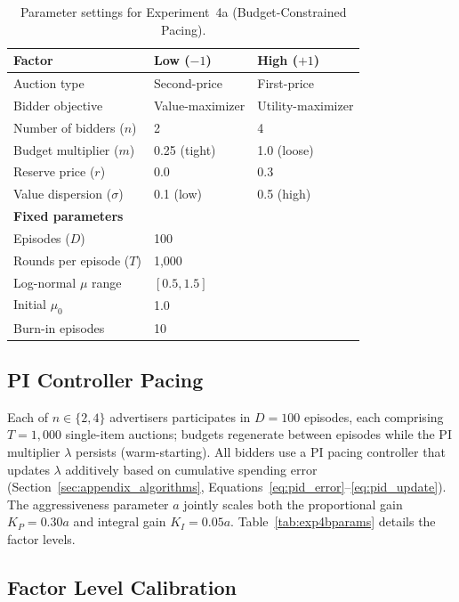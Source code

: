 \begin{table}[H]
\centering
\caption{Parameter settings for Experiment~4a (Budget-Constrained Pacing).}
\label{tab:exp4aparams}
\begin{tabular}{l l l}
\toprule
\textbf{Factor} & \textbf{Low ($-1$)} & \textbf{High ($+1$)}\\
\midrule
Auction type & Second-price & First-price \\
Bidder objective & Value-maximizer & Utility-maximizer \\
Number of bidders ($n$) & 2 & 4 \\
Budget multiplier ($m$) & 0.25 (tight) & 1.0 (loose) \\
Reserve price ($r$) & 0.0 & 0.3 \\
Value dispersion ($\sigma$) & 0.1 (low) & 0.5 (high) \\
\midrule
\multicolumn{3}{l}{\textbf{Fixed parameters}} \\
\midrule
Episodes ($D$) & \multicolumn{2}{l}{100} \\
Rounds per episode ($T$) & \multicolumn{2}{l}{1{,}000} \\
Log-normal $\mu$ range & \multicolumn{2}{l}{$[0.5, 1.5]$} \\
Initial $\mu_0$ & \multicolumn{2}{l}{1.0} \\
Burn-in episodes & \multicolumn{2}{l}{10} \\
\bottomrule
\end{tabular}
\end{table}

\subsection{PI Controller Pacing}

Each of $n \in \{2, 4\}$ advertisers participates in $D = 100$ episodes, each comprising $T = 1{,}000$ single-item auctions; budgets regenerate between episodes while the PI multiplier $\lambda$ persists (warm-starting). All bidders use a PI pacing controller that updates $\lambda$ additively based on cumulative spending error (Section~\ref{sec:appendix_algorithms}, Equations~\ref{eq:pid_error}--\ref{eq:pid_update}). The aggressiveness parameter $a$ jointly scales both the proportional gain $K_P = 0.30a$ and integral gain $K_I = 0.05a$. Table~\ref{tab:exp4bparams} details the factor levels.

\subsection{Factor Level Calibration}
\label{sec:factor_calibration}

